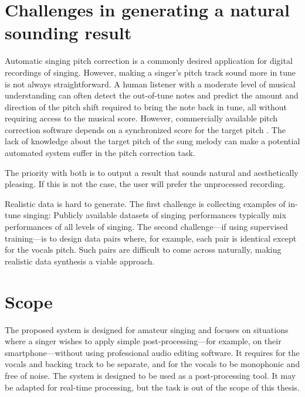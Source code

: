 \section{Challenges in generating a natural sounding result}

Automatic singing pitch correction is a commonly desired application for digital recordings of singing. However, making a singer's pitch track sound more in tune is not always straightforward. A human listener with a moderate level of musical understanding can often detect the out-of-tune notes and predict the amount and direction of the pitch shift required to bring the note back in tune, all without requiring access to the musical score. However, commercially available pitch correction software depends on a synchronized score for the target pitch \cite{antares:2016}. The lack of knowledge about the target pitch of the sung melody can make a potential automated system suffer in the pitch correction task.

The priority with both is to output a result that sounds natural and aesthetically pleasing. If this is not the case, the user will prefer the unprocessed recording. 

Realistic data is hard to generate. The first challenge is collecting examples of in-tune singing: Publicly available datasets of singing performances typically mix performances of all levels of singing. The second challenge---if using supervised training---is to design data pairs where, for example, each pair is identical except for the vocals pitch. Such pairs are difficult to come across naturally, making realistic data synthesis a viable approach.

\section{Scope}
The proposed system is designed for amateur singing and focuses on situations where a singer wishes to apply simple post-processing---for example, on their smartphone---without using professional audio editing software. It requires for the vocals and backing track to be separate, and for the vocals to be monophonic and free of noise. The system is designed to be used as a post-processing tool. It may be adapted for real-time processing, but the task is out of the scope of this thesis.

